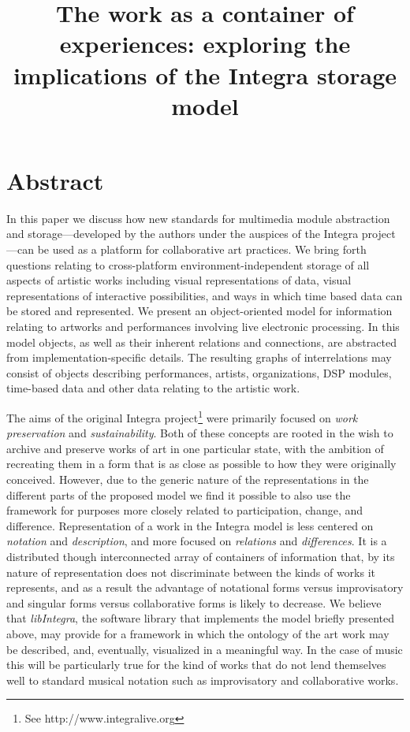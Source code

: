 \documentclass[a4paper, onecolumn]{article}
\begin{document}
\title{The work as a container of experiences: exploring the implications of the Integra storage model}
\date{}
\maketitle

\section*{Abstract}
\label{sec:abstract}

In this paper we discuss how new standards for multimedia module abstraction and storage---developed by the authors under the auspices of the Integra project---can be used as a platform for collaborative art practices. We bring forth questions relating to cross-platform environment-independent storage of all aspects of artistic works including visual representations of data, visual representations of interactive possibilities, and ways in which time based data can be stored and represented. We present an object-oriented model for information relating to artworks and performances involving live electronic processing. In this model objects, as well as their inherent relations and connections, are abstracted from implementation-specific details. The resulting graphs of interrelations may consist of objects describing performances, artists, organizations, DSP modules, time-based data and other data relating to the artistic work.

The aims of the original Integra project\footnote{See http://www.integralive.org} were primarily focused on \emph{work preservation} and \emph{sustainability}.
Both of these concepts are rooted in the wish to archive and preserve works of art in one particular state, with the ambition of recreating them in a form that is as close as possible to how they were originally conceived. However, due to the generic nature of the representations in the different parts of the proposed model we find it possible to also use the framework for purposes more closely related to participation, change, and difference.  Representation of a work in the Integra model is less centered on \emph{notation} and \emph{description}, and more focused on \emph{relations} and \emph{differences}. It is a distributed though interconnected array of containers of information that, by its nature of representation does not discriminate between the kinds of works it represents, and as a result the advantage of notational forms versus improvisatory and singular forms versus collaborative forms is likely to decrease. We believe that \emph{libIntegra}, the software library that implements the model briefly presented above, may provide for a framework in which the ontology of the art work may be described, and, eventually, visualized in a meaningful way. In the case of music this will be particularly true for the kind of works that do not lend themselves well to standard musical notation such as improvisatory and collaborative works.


% 
% 
\end{document}
